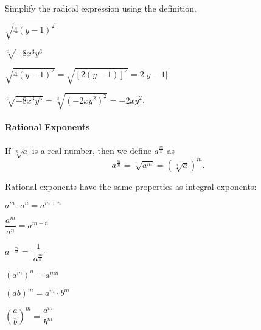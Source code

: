 	\begin{example}
		Simplify the radical expression using the definition.\\
		\begin{enumerate*}[label={(\arabic*)~}]
			\item $\sqrt{4(y-1)^2}$
			\item $\sqrt[3]{-8x^3y^6}$ \hfill\null
		\end{enumerate*}
	\end{example}
	\begin{solution}\mbox{}
		\begin{enumerate*}[label={\emph{(\arabic*)}~}]
			\item $\sqrt{4(y-1)^2}=\sqrt{[2(y-1)]^2}=2|y-1|$.
			\item $\sqrt[3]{-8x^3y^6}=\sqrt[3]{(-2xy^2)^2}=-2xy^2$. \hfill\null
		\end{enumerate*}
	\end{solution}



\paragraph*{Rational Exponents}
	If $\sqrt[n]{a}$ is a real number, then we define $a^{\frac mn}$ as
	\[
		a^{\frac mn}=\sqrt[n]{a^m}=(\sqrt[n]{a})^m.
	\]

	Rational exponents have the same properties as integral exponents:

	\begin{enumerate*}[label=\arabic*.,afterlabel={\quad}]
		\item \parbox{0.25\textwidth}{$a^m\cdot a^n=a^{m+n}$}
		\item \parbox{0.25\textwidth}{$\dfrac{a^m}{a^n}=a^{m-n}$}
		\item \parbox{0.25\textwidth}{$a^{-\frac mn}=\dfrac{~1~}{~a^{\frac mn}~}$}
	\end{enumerate*}

	\begin{enumerate*}[resume*]
		\item \parbox{0.25\textwidth}{$(a^m)^n=a^{mn}$}
		\item \parbox{0.25\textwidth}{$(ab)^m=a^m\cdot b^m$}
		\item \parbox{0.25\textwidth}{$\left(\dfrac ab\right)^m=\dfrac{a^m}{b^m}$}
	\end{enumerate*}

